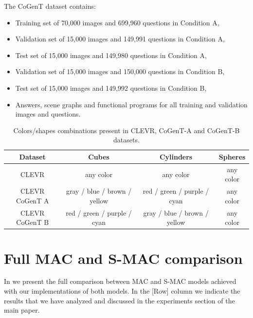 The CoGenT dataset contains:
\begin{itemize}
\item	Training set of 70,000 images and 699,960 questions in Condition A,
\item	Validation set of 15,000 images and 149,991 questions in Condition A,
\item	Test set of 15,000 images and 149,980 questions in Condition A,
\item	Validation set of 15,000 images and 150,000 questions in Condition B,
\item	Test set of 15,000 images and 149,992 questions in Condition B,
\item	Answers, scene graphs and functional programs for all training and validation images and questions.
\end{itemize}

\begin{table}[h!]
	\centering
	\begin{tabular}{cccc}
		\toprule
		Dataset        & Cubes              & Cylinders &  Spheres         \\
		\midrule
		CLEVR   &  any color &  any color        &    any color    \\
		CLEVR CoGenT A & gray / blue / brown / yellow  & red / green / purple / cyan       &    any color  \\
		CLEVR CoGenT B  & red / green / purple / cyan &   gray / blue / brown / yellow       &      any color  \\
		\bottomrule
	\end{tabular}
	\caption{Colors/shapes combinations present in CLEVR, CoGenT-A and CoGenT-B datasets.}
	\label{tab:cogent_conditions}
\end{table}

 
 \newpage
\section{Full MAC and S-MAC comparison}

In  we present the full comparison between MAC and S-MAC models achieved with our implementations of both models.
In the [Row] column we indicate the results that we have  analyzed and discussed in the experiments section of the main paper.


